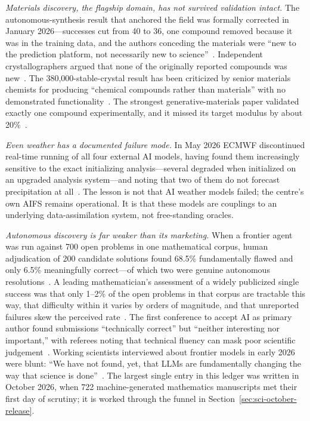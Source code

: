 \emph{Materials discovery, the flagship domain, has not survived validation intact.} The autonomous-synthesis result that anchored the field was formally corrected in January 2026---successes cut from 40 to 36, one compound removed because it was in the training data, and the authors conceding the materials were ``new to the prediction platform, not necessarily new to science''~\cite{alab-correction}. Independent crystallographers argued that none of the originally reported compounds was new~\cite{alab-critics}. The 380,000-stable-crystal result has been criticized by senior materials chemists for producing ``chemical compounds rather than materials'' with no demonstrated functionality~\cite{gnome-critique}. The strongest generative-materials paper validated exactly one compound experimentally, and it missed its target modulus by about 20\%~\cite{mattergen}.

\emph{Even weather has a documented failure mode.} In May 2026 ECMWF discontinued real-time running of all four external AI models, having found them increasingly sensitive to the exact initializing analysis---several degraded when initialized on an upgraded analysis system---and noting that two of them do not forecast precipitation at all~\cite{ecmwf-farewell}. The lesson is not that AI weather models failed; the centre's own AIFS remains operational. It is that these models are couplings to an underlying data-assimilation system, not free-standing oracles.

\emph{Autonomous discovery is far weaker than its marketing.} When a frontier agent was run against 700 open problems in one mathematical corpus, human adjudication of 200 candidate solutions found 68.5\% fundamentally flawed and only 6.5\% meaningfully correct---of which two were genuine autonomous resolutions~\cite{aletheia}. A leading mathematician's assessment of a widely publicized single success was that only 1--2\% of the open problems in that corpus are tractable this way, that difficulty within it varies by orders of magnitude, and that unreported failures skew the perceived rate~\cite{tao}. The first conference to accept AI as primary author found submissions ``technically correct'' but ``neither interesting nor important,'' with referees noting that technical fluency can mask poor scientific judgement~\cite{agents4science}. Working scientists interviewed about frontier models in early 2026 were blunt: ``We have not found, yet, that LLMs are fundamentally changing the way that science is done''~\cite{openai-science}. The largest single entry in this ledger was written in October 2026, when 722 machine-generated mathematics manuscripts met their first day of scrutiny; it is worked through the funnel in Section~\ref{sec:sci-october-release}.

